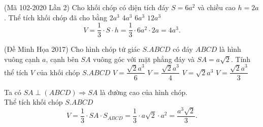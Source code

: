 \begin{ex}%
	(Mã 102-2020 Lần 2) Cho khối chóp có diện tích đáy $ S=6a^2$ và chiều cao $ h=2a$. Thể tích khối chóp đã cho bằng
	\choice
	{$ 2a^3$}
	{\True $ 4a^3$}
	{$ 6a^3$}
	{$ 12a^3$}
	\loigiai
	{
		$$V=\dfrac{1}{3}\cdot S\cdot h=\dfrac{1}{3}\cdot 6a^2\cdot 2a=4a^3.$$
	}
\end{ex}

\begin{ex}%
	(Đề Minh Họa 2017) Cho hình chóp tứ giác $S.ABCD$ có đáy $ABCD$ là hình vuông cạnh $a$, cạnh bên $SA$ vuông góc với mặt phẳng đáy và $ SA=a\sqrt{2}$. Tính thể tích $ V$ của khối chóp $S.ABCD$ 
	\choice
	{$ V=\dfrac{\sqrt{2}{a^3}}{6}$}
	{$ V=\dfrac{\sqrt{2}{a^3}}{4}$}
	{$ V=\sqrt{2}{a^3}$}
	{\True $V=\dfrac{\sqrt{2}{a^3}}{3}$}
	\loigiai
	{
		\begin{center}
		\end{center}
		Ta có $ SA\perp\left(ABCD\right)\Rightarrow SA$ là đường cao của hình chóp.\\
		Thể tích khối chóp $S.ABCD$ $$ V=\dfrac{1}{3}\cdot SA\cdot S_{ABCD}=\dfrac{1}{3}\cdot a\sqrt{2}\cdot a^2=\dfrac{a^3\sqrt{2}}{3}.$$}
\end{ex}

